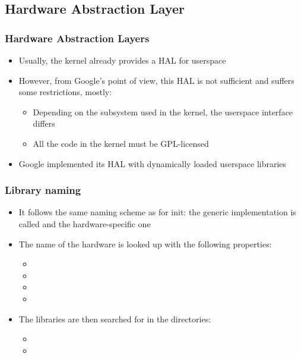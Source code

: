 \subsection{Hardware Abstraction Layer}
\begin{frame}
  \frametitle{Hardware Abstraction Layers}
  \begin{itemize}
  \item Usually, the kernel already provides a HAL for userspace
  \item However, from Google's point of view, this HAL is not sufficient and
    suffers some restrictions, mostly:
    \begin{itemize}
    \item Depending on the subsystem used in the kernel, the userspace
      interface differs
    \item All the code in the kernel must be GPL-licensed
    \end{itemize}
  \item Google implemented its HAL with dynamically loaded userspace libraries
  \end{itemize}
\end{frame}

\begin{frame}
  \frametitle{Library naming}
  \begin{itemize}
  \item It follows the same naming scheme as for init: the generic
    implementation is called  and the hardware-specific
    one 
  \item The name of the hardware is looked up with the following properties:
    \begin{itemize}
    \item {}
    \item {}
    \item {}
    \item {}
    \end{itemize}
  \item The libraries are then searched for in the directories:
    \begin{itemize}
    \item {}
    \item {}
    \end{itemize}
  \end{itemize}
\end{frame}

